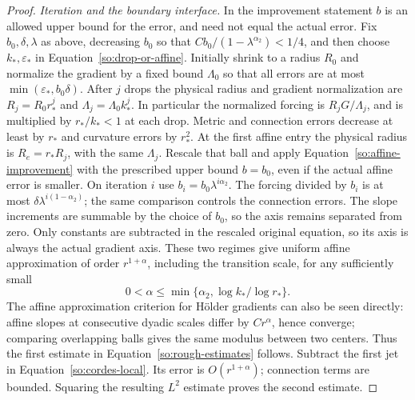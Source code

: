 \begin{proof}
\emph{Iteration and the boundary interface.}
In the improvement statement $b$ is an allowed upper bound for the
error, and need not equal the actual error.  Fix $b_0,\delta,\lambda$
as above, decreasing $b_0$ so that
$Cb_0/(1-\lambda^{\alpha_2})<1/4$, and then choose $k_*,\varepsilon_*$
in Equation~\ref{so:drop-or-affine}.  Initially shrink to a radius $R_0$
and normalize the gradient by a fixed bound $\Lambda_0$ so that all errors
are at most $\min(\varepsilon_*,b_0\delta)$.  After $j$ drops the
physical radius and gradient normalization are
$R_j=R_0r_*^j$ and $\Lambda_j=\Lambda_0k_*^j$.  In particular the normalized
forcing is $R_jG/\Lambda_j$, and is multiplied by $r_*/k_*<1$ at each drop.
Metric and connection errors decrease at least by $r_*$ and curvature
errors by $r_*^2$.  At the first affine entry the physical radius is
$R_e=r_*R_j$, with the same $\Lambda_j$.  Rescale that ball and apply
Equation~\ref{so:affine-improvement} with the prescribed upper bound
$b=b_0$, even if the actual affine error is smaller.  On iteration $i$
use $b_i=b_0\lambda^{i\alpha_2}$.  The forcing divided by $b_i$ is
at most $\delta\lambda^{i(1-\alpha_2)}$; the same comparison controls
the connection errors.  The slope increments are summable by the
choice of $b_0$, so the axis remains separated from zero.  Only
constants are subtracted in the rescaled original equation, so its
axis is always the actual gradient axis.  These two regimes give
uniform affine approximation of order $r^{1+\alpha}$, including the
transition scale, for any sufficiently small
\[
 0<\alpha\le
 \min\{\alpha_2,\log k_*/\log r_*\}.
\]
The affine approximation criterion for H\"older gradients can also be
seen directly: affine slopes at consecutive dyadic scales differ by
$Cr^\alpha$, hence converge; comparing overlapping balls gives the
same modulus between two centers.  Thus the first estimate in
Equation~\ref{so:rough-estimates} follows.  Subtract the first jet in
Equation~\ref{so:cordes-local}.  Its error is $O(r^{1+\alpha})$;
connection terms are bounded.  Squaring the resulting $L^2$ estimate
proves the second estimate.


\end{proof}
